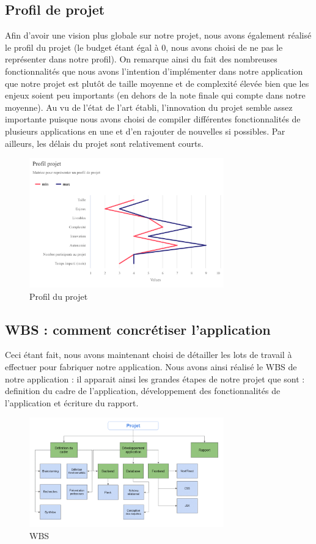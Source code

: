 \documentclass[french,a4paper]{article}
\begin{document}
\subsection{Profil de projet}
Afin d’avoir une vision plus globale sur notre projet, nous avons également réalisé le profil du projet (le budget étant égal à 0, nous avons choisi de ne pas le représenter dans notre profil). On remarque ainsi du fait des nombreuses fonctionnalités que nous avons l’intention d’implémenter dans notre application que notre projet est plutôt de taille moyenne et de complexité élevée bien que les enjeux soient peu importants (en dehors de la note finale qui compte dans notre moyenne). Au vu de l’état de l’art établi, l’innovation du projet semble assez importante puisque nous avons choisi de compiler différentes fonctionnalités de plusieurs applications en une et d’en rajouter de nouvelles si possibles. Par ailleurs, les délais du projet sont relativement courts.
\begin{figure}[H]
    \centering
    \includegraphics[width=0.75\textwidth]{img/profil_projet.png}
    \caption{Profil du projet}
\end{figure} 

\subsection{WBS : comment concrétiser l’application}
Ceci étant fait, nous avons maintenant choisi de détailler les lots de travail à effectuer pour fabriquer notre application. Nous avons ainsi réalisé le WBS de notre application : il apparait ainsi les grandes étapes de notre projet que sont : definition du cadre de l’application, développement des fonctionnalités de l’application et écriture du rapport.
\begin{figure}[H]
    \centering
    \includegraphics[width=0.75\textwidth]{img/WBS.png}
    \caption{WBS}
\end{figure} 
\end{document}
